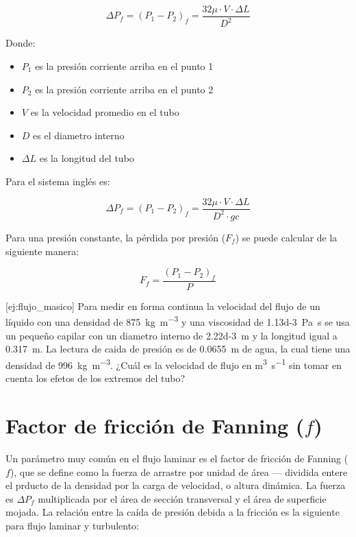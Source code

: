 \documentclass{AsignaturaResumen}
\begin{document}
\begin{equation}
    \Delta P_{f} = (P_{1} - P_{2})_{f} = \frac{32\mu \cdot V \cdot \Delta L}{D^{2}}
\end{equation}

Donde:
\begin{itemize}
    \item $P_{1}$ es la presión corriente arriba en el punto 1
    \item $P_{2}$ es la presión corriente arriba en el punto 2
    \item $V$ es la velocidad promedio en el tubo
    \item $D$ es el diametro interno
    \item $\Delta L$ es la longitud del tubo
\end{itemize}

Para el sistema inglés es:

\begin{equation*}
    \Delta P_{f} = (P_{1} - P_{2})_{f} = \frac{32\mu \cdot V \cdot \Delta L}{D^{2} \cdot gc}
\end{equation*}

Para una presión constante, la pérdida por presión ($F_{f}$) se puede calcular de la siguiente manera:

\begin{equation}
    F_{f} = \frac{(P_{1} - P_{2})_{f}}{P}
\end{equation}

[ej:flujo_masico]{
    Para medir en forma continua la velocidad del flujo de un líquido con una densidad de \qty{875}{\kg\per\m\cubed} y una viscosidad de \qty{1.13d-3}{\pascal\s} se usa un pequeño capilar con un diametro interno de \qty{2.22d-3}{\m} y la longitud igual a \qty{0.317}{\m}. La lectura de caida de presión es de \qty{0.0655}{\m} de agua, la cual tiene una densidad de \qty{996}{\kg\per\m\cubed}. ¿Cuál es la velocidad de flujo en \unit{\m\cubed\per\s} sin tomar en cuenta los efetos de los extremos del tubo?
}

\section{Factor de fricción de Fanning ($f$)}

Un parámetro muy común en el flujo laminar es el factor de fricción de Fanning ($f$), que se define como la fuerza de arrastre por unidad de área --- dividida entere el prducto de la densidad por la carga de velocidad, o altura dinámica. La fuerza es $\Delta P_{f}$ multiplicada por el área de sección transversal y el área de superficie mojada. La relación entre la caída de presión debida a la fricción es la siguiente para flujo laminar y turbulento:
\end{document}
